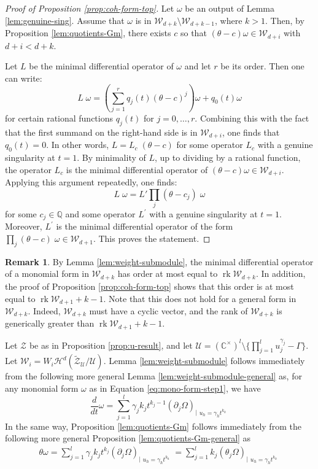 \documentclass[11pt, reqno]{amsart}
\theoremstyle{plain}
\theoremstyle{definition}
\newtheorem{rem}[thm]{Remark}
\newcommand{\CC}{\mathbb{C}}
\newcommand{\QQ}{\mathbb{Q}}
\DeclareMathOperator{\rk}{rk}
\begin{document}
\begin{proof}[Proof of Proposition \ref{prop:coh-form-top}]
Let $\omega$ be an output of Lemma \ref{lem:genuine-sing}. Assume that $\omega$ is in $\mathcal{W}_{d+k}\setminus \mathcal{W}_{d+k-1}$, where $k >1$. 
Then, by Proposition \ref{lem:quotients-Gm}, there exists $c$ so that $(\theta-c)  \omega \in \mathcal{W}_{d+i}$ with $d+i < d+k$. 

Let $L$ be the minimal differential operator of $\omega$ and let $r$ be its order. Then one can write:
\[
L \; \omega= \left(\sum_{j=1}^r q_j(t) (\theta-c)^j \right) \omega+q_0(t) \omega
\] for certain rational functions $q_j(t)$ for $j=0, \dots, r$.
Combining this with the fact that the first summand on the right-hand side is in $\mathcal{W}_{d+i}$, one finds that $q_0(t)=0$. In other words, 
$L= L_c  \; (\theta -c)$ for some operator $L_c$ with a genuine singularity at $t=1$. By minimality of $L$, up to dividing by a rational function, the operator $L_c$ is the minimal differential operator of $(\theta -c)\omega \in \mathcal{W}_{d+i}$.
Applying this argument repeatedly, one finds:
\[ 
L\; \omega= L' \prod_j (\theta- c_j) \; \omega
\] for some $c_j \in \QQ$ and some operator $L^\prime$ with a genuine singularity at $t=1$. Moreover, $L^\prime$ is the minimal differential operator of the form $\prod_j (\theta- c) \; \omega \in \mathcal{W}_{d+1}$. This proves the statement.
\end{proof}

\begin{rem} 
\label{rem:orders-ranks}
By Lemma \ref{lem:weight-submodule}, the minimal differential operator of a monomial form in $\mathcal{W}_{d+k}$ has order at most equal to $\rk\mathcal{W}_{d+k}$. In addition, the proof of Proposition \ref{prop:coh-form-top} shows that this order is at most equal to $ \operatorname{rk}  \mathcal{W}_{d+1} + k-1$. 
Note that this does not hold for a general form in $\mathcal{W}_{d+k}$. Indeed, $\mathcal{W}_{d+k}$ must have a cyclic vector, and the rank of $\mathcal{W}_{d+k}$ is generically greater than
$ \operatorname{rk}  \mathcal{W}_{d+1} + k-1$. 
\end{rem}

Let $\mathcal{Z}$ be as in Proposition \ref{prop:u-result}, and let $\mathcal{U}=(\CC^\times)^l \setminus \{\prod_{j=1}^l u_j^{\gamma_j} -\Gamma\}$. Let $\mathscr{W}_i={W}_i\mathcal{H}^d(\widetilde{\mathcal{Z}}_\mathcal{U}/\mathcal{U})$.
Lemma \ref{lem:weight-submodule} follows immediately from the following more general Lemma \ref{lem:weight-submodule-general} as, for any monomial form $\omega$ as in Equation \eqref{eq:mono-form-step1}, we have
\[
\frac{d}{dt} \omega= \sum_{j=1}^l \gamma_j k_jt^{k_j-1} 
\left(\partial_j \Omega\right)_{\big|\substack{u_h=\gamma_h t^{k_h}}} 
\]
In the same way, Proposition \ref{lem:quotients-Gm} follows immediately from the following more general Proposition \ref{lem:quotients-Gm-general} as
\begin{align*}
\theta  \omega   =  \sum_{j=1}^l \gamma_j k_j t^{k_j} \left( {\partial_j \Omega} \right)_{\big|\substack{u_h=\gamma_h t^{k_h}}}=  \sum_{j=1}^l  k_j \left( \theta_j \Omega \right)_{\big|\substack{u_h=\gamma_h t^{k_h}}}
\end{align*}
\end{document}
